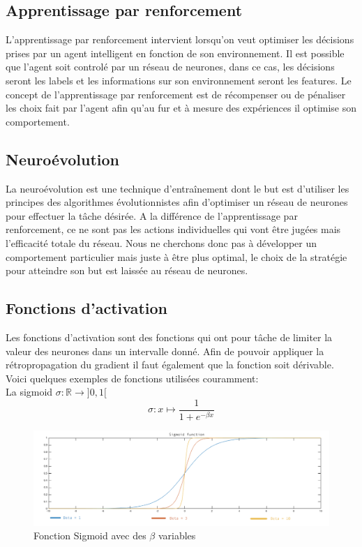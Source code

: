 \documentclass{article}
\begin{document}
\subsection{Apprentissage par renforcement}

L'apprentissage par renforcement intervient lorsqu'on veut optimiser les décisions prises par un agent intelligent en fonction de son environnement. Il est possible que l'agent soit controlé par un réseau de neurones, dans ce cas, les décisions seront les labels et les informations sur son environnement seront les features. Le concept de l'apprentissage par renforcement est de récompenser ou de pénaliser les choix fait par l'agent afin qu'au fur et à mesure des expériences il optimise son comportement\cite{wikirl}.

\subsection{Neuroévolution}

La neuroévolution est une technique d'entraînement dont le but est d'utiliser les principes des algorithmes évolutionnistes afin d'optimiser un réseau de neurones pour effectuer la tâche désirée. A la différence de l'apprentissage par renforcement, ce ne sont pas les actions individuelles qui vont être jugées mais l'efficacité totale du réseau. Nous ne cherchons donc pas à développer un comportement particulier mais juste à être plus optimal, le choix de la stratégie pour atteindre son but est laissée au réseau de neurones\cite{wikineuroevolution}.\\

\subsection{Fonctions d'activation}

Les fonctions d'activation sont des fonctions qui ont pour tâche de limiter la valeur des neurones dans un intervalle donné. Afin de pouvoir appliquer la rétropropagation du gradient il faut également que la fonction soit dérivable.
Voici quelques exemples de fonctions utilisées couramment:\\

La sigmoid $\sigma : \mathbb{R} \rightarrow ]0, 1[$
\begin{equation}
	\sigma : x \mapsto \frac{1}{1 + e^{-\beta x}}
\end{equation}

\begin{figure}[H]
\begin{center}
	\includegraphics[scale=0.4]{sigmoid.png} 
	\caption{Fonction Sigmoid avec des $\beta$ variables}
\end{center}
\end{figure}
\end{document}
